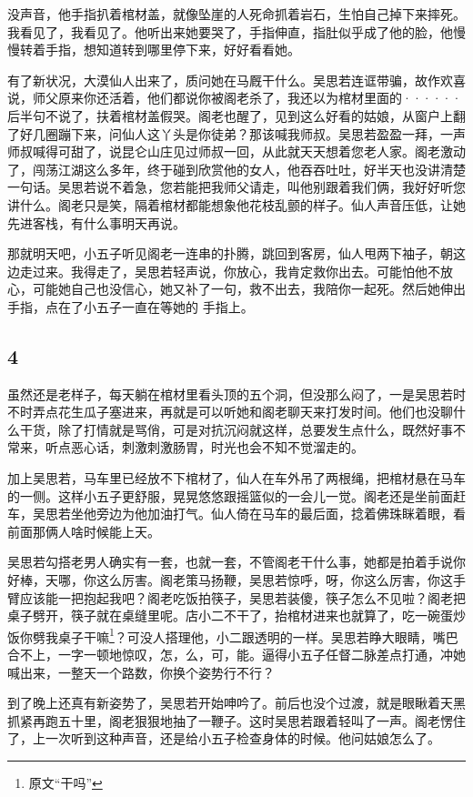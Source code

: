没声音，他手指扒着棺材盖，就像坠崖的人死命抓着岩石，生怕自己掉下来摔死。我看见了，我看见了。他听出来她要哭了，手指伸直，指肚似乎成了他的脸，他慢慢转着手指，想知道转到哪里停下来，好好看看她。

有了新状况，大漠仙人出来了，质问她在马厩干什么。吴思若连诓带骗，故作欢喜说，师父原来你还活着，他们都说你被阁老杀了，我还以为棺材里面的······后半句不说了，扶着棺材盖假哭。阁老也醒了，见到这么好看的姑娘，从窗户上翻了好几圈蹦下来，问仙人这丫头是你徒弟？那该喊我师叔。吴思若盈盈一拜，一声师叔喊得可甜了，说昆仑山庄见过师叔一回，从此就天天想着您老人家。阁老激动了，闯荡江湖这么多年，终于碰到欣赏他的女人，他吞吞吐吐，好半天也没讲清楚一句话。吴思若说不着急，您若能把我师父请走，叫他别跟着我们俩，我好好听您讲什么。阁老只是笑，隔着棺材都能想象他花枝乱颤的样子。仙人声音压低，让她先进客栈，有什么事明天再说。

那就明天吧，小五子听见阁老一连串的扑腾，跳回到客房，仙人甩两下袖子，朝这边走过来。我得走了，吴思若轻声说，你放心，我肯定救你出去。可能怕他不放心，可能她自己也没信心，她又补了一句，救不出去，我陪你一起死。然后她伸出手指，点在了小五子一直在等她的
手指上。
\newline

{\centering\subsection{4}}

虽然还是老样子，每天躺在棺材里看头顶的五个洞，但没那么闷了，一是吴思若时不时弄点花生瓜子塞进来，再就是可以听她和阁老聊天来打发时间。他们也没聊什么干货，除了打情就是骂俏，可是对抗沉闷就这样，总要发生点什么，既然好事不常来，听点恶心话，刺激刺激肠胃，时光也会不知不觉溜走的。

加上吴思若，马车里已经放不下棺材了，仙人在车外吊了两根绳，把棺材悬在马车的一侧。这样小五子更舒服，晃晃悠悠跟摇篮似的一会儿一觉。阁老还是坐前面赶车，吴思若坐他旁边为他加油打气。仙人倚在马车的最后面，捻着佛珠眯着眼，看前面那俩人啥时候能上天。

吴思若勾搭老男人确实有一套，也就一套，不管阁老干什么事，她都是拍着手说你好棒，天哪，你这么厉害。阁老策马扬鞭，吴思若惊呼，呀，你这么厉害，你这手臂应该能一把抱起我吧？阁老吃饭拍筷子，吴思若装傻，筷子怎么不见啦？阁老把桌子劈开，筷子就在桌缝里呢。店小二不干了，抬棺材进来也就算了，吃一碗蛋炒饭你劈我桌子干嘛\footnote{原文“干吗”}？可没人搭理他，小二跟透明的一样。吴思若睁大眼睛，嘴巴合不上，一字一顿地惊叹，怎，么，可，能。逼得小五子任督二脉差点打通，冲她喊出来，一整天一个路数，你换个姿势行不行？

到了晚上还真有新姿势了，吴思若开始呻吟了。前后也没个过渡，就是眼瞅着天黑抓紧再跑五十里，阁老狠狠地抽了一鞭子。这时吴思若跟着轻叫了一声。阁老愣住了，上一次听到这种声音，还是给小五子检查身体的时候。他问姑娘怎么了。

